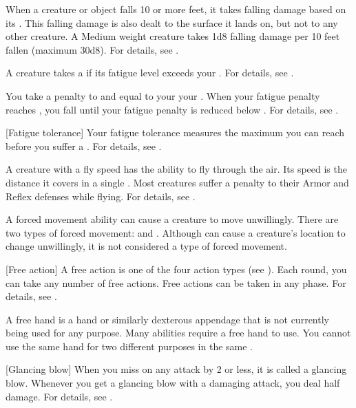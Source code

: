  When a creature or object falls 10 or more feet, it takes falling damage based on its .
This falling damage is also dealt to the surface it lands on, but not to any other creature.
A Medium weight creature takes 1d8 falling damage per 10 feet fallen (maximum 30d8).
For details, see .

 A creature takes a  if its fatigue level exceeds your .
For details, see .

 You take a penalty to  and  equal to your  \sub your .
When your fatigue penalty reaches , you fall \unconscious until your fatigue penalty is reduced below .
For details, see .

[Fatigue tolerance] Your fatigue tolerance measures the maximum  you can reach before you suffer a .
For details, see .

 A creature with a fly speed has the ability to fly through the air.
Its speed is the distance it covers in a single .
Most creatures suffer a  penalty to their Armor and Reflex defenses while flying.
For details, see .

 A forced movement ability can cause a creature to move unwillingly.
There are two types of forced movement:  and .
Although  can cause a creature's location to change unwillingly, it is not considered a type of forced movement.

[Free action] A free action is one of the four action types (see ).
Each round, you can take any number of free actions.
Free actions can be taken in any phase.
For details, see .

 A free hand is a hand or similarly dexterous appendage that is not currently being used for any purpose.
Many abilities require a free hand to use.
You cannot use the same hand for two different purposes in the same .

[Glancing blow] When you miss on any attack by 2 or less, it is called a glancing blow.
Whenever you get a glancing blow with a damaging attack, you deal half damage.
For details, see .

